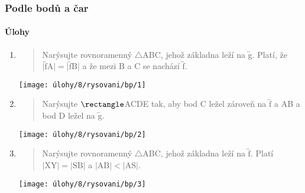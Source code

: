 \newpage

\subsubsection{Podle bodů a čar}

\paragraph{Úlohy}
\begin{enumerate}
    \item
    \begin{minipage}[t]{\linewidth}
        \begin{quote}
            Narýsujte rovnoramenný $\triangle$ABC, jehož základna leží na $\overleftrightarrow{\text{g}}$.
            Platí, že $\lvert \overleftrightarrow{\text{f}} \text{A} \rvert = \lvert \overleftrightarrow{\text{f}} \text{B} \rvert$ a že mezi B a C se nachází $\overleftrightarrow{\text{f}}$.
        \end{quote}
        \centering
        \texttt{[image: úlohy/8/rysovani/bp/1]}

    \end{minipage}

    \item
    \begin{minipage}[t]{\linewidth}
        \begin{quote}
            Narýsujte $\rectangle$ACDE tak, aby bod C ležel zároveň na $\overleftrightarrow{\text{f}}$ a AB a bod D ležel na $\overleftrightarrow{\text{g}}$.
        \end{quote}
        \centering
        \texttt{[image: úlohy/8/rysovani/bp/2]}

    \end{minipage}

    \item
    \begin{minipage}[t]{\linewidth}
        \begin{quote}
            Narýsujte rovnoramenný $\triangle$ABC, jehož základna leží na $\overleftrightarrow{\text{f}}$.
            Platí $\lvert \text{XY} \rvert = \lvert \text{SB} \rvert$ a $\lvert \text{AB} \rvert < \lvert \text{AS} \rvert$.
        \end{quote}
        \centering
        \texttt{[image: úlohy/8/rysovani/bp/3]}

    \end{minipage}


\end{enumerate}
